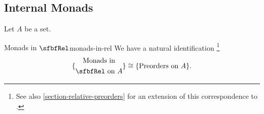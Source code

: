 \subsection{Internal Monads}\label{subsection-internal-monads-in-rel}
Let $A$ be a set.
\begin{proposition}{Monads in $\sfbfRel$}{monads-in-rel}%
    We have a natural identification%
    \footnote{%
        See also \cref{section-relative-preorders} for an extension of this correspondence to .
        \par\vspace*{\TCBBoxCorrection}
    }%
    \[
        \{
            \begin{gathered}
                \text{Monads in}\\
                \text{$\sfbfRel$ on $A$}
            \end{gathered}
        \}
        \cong
        \{\text{Preorders on $A$}\}.
    \]%
\end{proposition}

